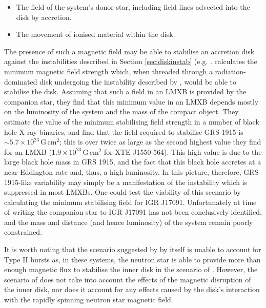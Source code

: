 \begin{itemize}
\item The field of the system's donor star, including field lines advected into the disk by accretion.
\item The movement of ionised material within the disk.
\end{itemize}
The presence of such a magnetic field may be able to stabilise an accretion disk against the instabilities described in Section \ref{sec:diskinstab} (e.g. \citealp{Sadowski_MagField}.  \citeauthor{Sadowski_MagField} calculates the minimum magnetic field strength which, when threaded through a radiation-dominated disk undergoing the instability described by \citet{Shakura_Instab}, would be able to stabilise the disk.  Assuming that such a field in an LMXB is provided by the companion star, they find that this minimum value in an LMXB depends mostly on the luminosity of the system and the mass of the compact object.  They estimate the value of the minimum stabilising field strength in a number of black hole X-ray binaries, and find that the field required to stabilise GRS 1915 is $\sim5.7\times10^{23}$\,G\,cm$^2$; this is over twice as large as the second highest value they find for an LMXB ($1.9\times10^{23}$\,G\,cm$^2$ for XTE J1550-564).  This high value is due to the large black hole mass in GRS 1915, and the fact that this black hole accretes at a near-Eddington rate and, thus, a high luminosity.  In this picture, therefore, GRS 1915-like variability may simply be a manifestation of the \citet{Shakura_Instab} instability which is suppressed in most LMXBs.  One could test the viability of this scenario by calculating the minimum stabilising field for IGR J17091.  Unfortunately at time of writing the companion star to IGR J17091 has not been conclusively identified, and the mass and distance (and hence luminosity) of the system remain poorly constrained.
\par It is worth noting that the scenario suggested by \citet{Sadowski_MagField} by itself is unable to account for Type II bursts as, in these systems, the neutron star is able to provide more than enough magnetic flux to stabilise the inner disk in the scenario of \citeauthor{Sadowski_MagField}.  However, the scenario of \citeauthor{Sadowski_MagField} does not take into account the effects of the magnetic disruption of the inner disk, nor does it account for any effects caused by the disk's interaction with the rapidly spinning neutron star magnetic field.

